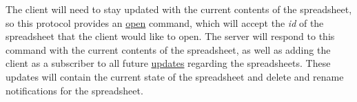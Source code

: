 The client will need to stay updated with the current contents of the 
spreadsheet, so this protocol provides an \hyperref[sec:message:open]{open} 
command, which will accept the \emph{id} of the spreadsheet that the client 
would like to open. The server will respond to this command with the current 
contents of the spreadsheet, as well as adding the client as a subscriber to 
all future \hyperref[sec:message:updates]{updates} regarding the spreadsheets. These updates will contain the 
current state of the spreadsheet and delete and rename notifications for the 
spreadsheet. 